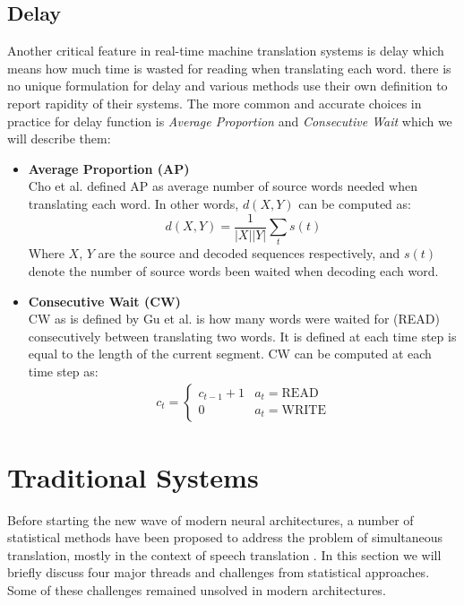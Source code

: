\documentclass{sfuthesis}
\begin{document}
\subsection{Delay} \label{subsec:delay}
Another critical feature in real-time machine translation systems is delay which means how much time is wasted for reading when translating each word. there is no unique formulation for delay and various methods use their own definition to report rapidity of their systems. The more common and accurate choices in practice for delay function is \emph{Average Proportion} and \emph{Consecutive Wait} which we will describe them: 
\begin{itemize}
    \item \textbf{Average Proportion (AP)}\\
    Cho et al. \cite{cho:2016:Arxive} defined AP as average number of source words needed when translating each word. In other words, $d(X, Y)$ can be computed as:
    $$d(X, Y) = \frac{1}{|X||Y|} \sum_t s(t)$$
    Where $X$, $Y$ are the source and decoded sequences respectively, and $s(t)$ denote the number of source words been waited when decoding each word.
    \item \textbf{Consecutive Wait (CW)}\\
    CW as is defined by Gu et al. \cite{gu:2017:EACL} is how many words were waited for (READ) consecutively between translating two words. It is defined at each time step is equal to the length of the current segment. CW can be computed at each time step as: 
    \begin{align*}
        c_t = 
        \begin{cases}
        c_{t-1} + 1 & a_t = \text{READ}\\
        0           & a_t = \text{WRITE}
        \end{cases}
    \end{align*}
\end{itemize}
\vspace{0.2cm}
\section{Traditional Systems} \label{chap:TS} %
Before starting the new wave of modern neural architectures, a number of statistical methods have been proposed to address the problem of simultaneous translation, mostly in the context of speech translation \cite{Bangalore:2012:NAACL, Fugen:2007:MT}. In this section we will briefly discuss four major threads and challenges from statistical approaches. Some of these challenges remained unsolved in modern architectures.
\end{document}
